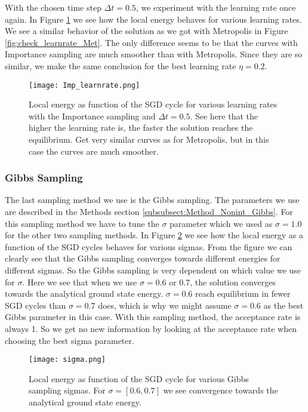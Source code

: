 \documentclass[12pt,a4paper,english]{article}
\begin{document}
\newpage
With the chosen time step $\Delta t=0.5$, we experiment with the learning rate once again. In Figure \ref{fig:check_learnrate_Imp} we see how the local energy behaves for various learning rates. We see a similar behavior of the solution as we got with Metropolis in Figure \ref{fig:check_learnrate_Met}. The only difference seems to be that the curves with Importance sampling are much smoother than with Metropolis. Since they are so similar, we make the same conclusion for the best learning rate $\eta=0.2$.

\begin{figure}[htbp!]
	\centering\texttt{[image: Imp\_learnrate.png]}
	\caption{Local energy as function of the SGD cycle for various learning rates with the Importance sampling and $\Delta t=0.5$. See here that the higher the learning rate is, the faster the solution reaches the equilibrium. Get very similar curves as for Metropolis, but in this case the curves are much smoother. \label{fig:check_learnrate_Imp}}
\end{figure} 

\subsubsection{Gibbs Sampling}
\label{subsubsect:Results_nonint_Gibbs}
The last sampling method we use is the Gibbs sampling. The parameters we use are described in the Methods section \ref{subsubsect:Method_Nonint_Gibbs}. For this sampling method we have to tune the $\sigma$ parameter which we used as $\sigma=1.0$ for the other two sampling methods. In Figure \ref{fig:check_sigma} we see how the local energy as a function of the SGD cycles behaves for various sigmas. From the figure we can clearly see that the Gibbs sampling converges towards different energies for different sigmas. So the Gibbs sampling is very dependent on which value we use for $\sigma$. Here we see that when we use $\sigma=0.6$ or 0.7, the solution converges towards the analytical ground state energy. $\sigma=0.6$ reach equilibrium in fewer SGD cycles than $\sigma=0.7$ does, which is why we might assume $\sigma=0.6$ as the best Gibbs parameter in this case. With this sampling method, the acceptance rate is always 1. So we get no new information by looking at the acceptance rate when choosing the best sigma parameter.

\begin{figure}[htbp!]
	\centering\texttt{[image: sigma.png]}
	\caption{Local energy as function of the SGD cycle for various Gibbs sampling sigmas. For $\sigma=[0.6, 0.7]$ we see convergence towards the analytical ground state energy. \label{fig:check_sigma}}
\end{figure}
\end{document}
